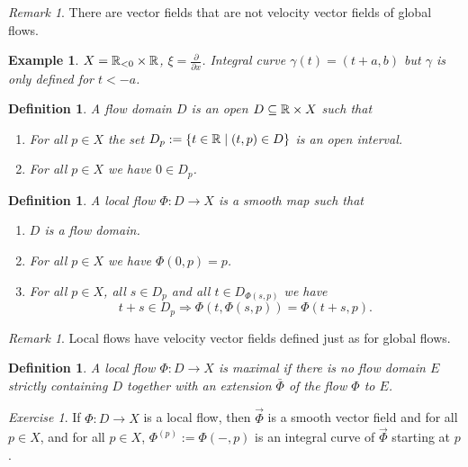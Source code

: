 \documentclass[A4paper, british]{amsart}
\theoremstyle{darkgreentheorem}
\theoremstyle{darkbluedefinition}
\newtheorem{defn}[thm]{Definition}
\theoremstyle{darkredexample}
\newtheorem{exa}[thm]{Example}
\theoremstyle{remark}
\newtheorem{rem}[thm]{Remark}
\newtheorem{exe}[thm]{Exercise}
\newcommand{\1}{\mathbbm{1}}
\newcommand{\db}{\marginnote{\dbend}}
\newcommand{\tms}{\times}
\newcommand{\sub}{\subseteq}
\begin{document}
\begin{rem}
    \db There are vector fields that are not velocity vector fields of global flows.
\end{rem}

\begin{exa}
    $X=\R_{<0}\tms \R$, $\xi=\frac{\partial }{\partial x}$.
    Integral curve $\gamma(t)=(t+a,b)$ but $\gamma$ is only defined for $t<-a$.
\end{exa}

\begin{defn}
    A \textit{flow domain} $D$ is an open $D\sub \R\tms X$ such that
    \begin{enumerate}
	\item For all $p\in X$ the set $D_{p}:=\{t\in \mathbb{R}\mid (t,p)\in D\}$ is an open interval.
	\item For all $p\in X$ we have $0\in D_{p}$.
    \end{enumerate}
\end{defn}

\begin{defn}
    A \textit{local flow} $\Phi\colon D\to X$ is a smooth map such that
    \begin{enumerate}
	\item $D$ is a flow domain.
	\item For all $p\in X$ we have $\Phi(0,p)=p$.
	\item For all $p\in X$, all $s\in D_{p}$ and all $t\in D_{\Phi(s,p)}$ we have
	    \[ t+s\in D_{p}\Rightarrow \Phi(t,\Phi(s,p))=\Phi(t+s,p).\]
    \end{enumerate}
\end{defn}

\begin{rem}
    Local flows have velocity vector fields defined just as for global flows.
\end{rem}

\begin{defn}
    A local flow $\Phi\colon D\to X$ is \textit{maximal} if there is no flow domain $E$ strictly containing $D$ together with an extension $\bar{\Phi}$ of the flow $\Phi$ to $E$.
\end{defn}

\begin{exe}
    If $\Phi\colon D\to X$ is a local flow, then $\vec{\Phi}$ is a smooth vector field and for all $p\in X$, and for all $p\in X$, $\Phi^{(p)}:=\Phi(-,p)$ is an integral curve of $\vec{\Phi}$ starting at $p$.
\end{exe}
\end{document}
